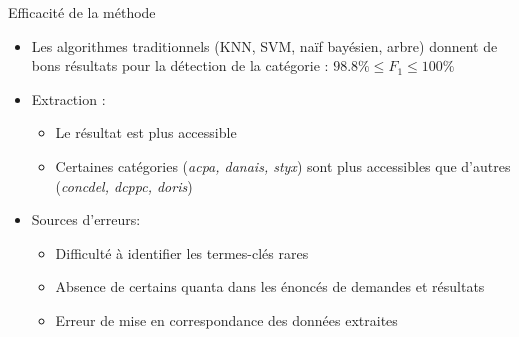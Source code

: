 \begin{frame}[t]{\mysubsectiontitle}
	Efficacité de la méthode
	\begin{itemize} \scriptsize
		\item Les algorithmes traditionnels (KNN, SVM, naïf bayésien, arbre) donnent de bons résultats pour la détection de la catégorie : $98.8\% \leq F_1 \leq 100\%$
		\item Extraction :
		{}
		\begin{itemize} \scriptsize
			\item Le résultat est plus accessible 
			\item Certaines catégories (\textit{acpa, danais, styx}) sont plus accessibles que d'autres (\textit{concdel, dcppc, doris})
		\end{itemize}				
		\item Sources d'erreurs:
		\begin{itemize} \scriptsize
			\item Difficulté à identifier les termes-clés rares
			\item Absence de certains quanta dans les énoncés de demandes et résultats
			\item Erreur de mise en correspondance des données extraites
		\end{itemize}
	\end{itemize}
\end{frame}
